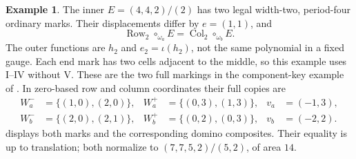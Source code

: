 \documentclass[11pt,a4paper]{amsart}
\numberwithin{equation}{section}
\theoremstyle{plain}
\theoremstyle{definition}
\newtheorem{example}[theorem]{Example}
\newcommand{\Row}{\operatorname{Row}}
\newcommand{\Col}{\operatorname{Col}}
\newcommand{\ii}{\iota}
\begin{document}
\begin{example}\label{ex:gauge}
The inner \(E=(4,4,2)/(2)\) has two legal width-two, period-four
ordinary marks.  Their displacements differ by \(e=(1,1)\), and
\[
 \Row_2\circ_{\omega_a}E=\Col_2\circ_{\omega_b}E.
\]
The outer functions are \(h_2\) and \(e_2=\ii(h_2)\), not the same
polynomial in a fixed gauge.  Each end mark has two cells adjacent to
the middle, so this example uses I--IV without V.  These are the two
full markings in the component-key example of \cite{Shields2026Gluing}.
In zero-based row and column coordinates their full copies are
\[
 \begin{aligned}
 W_a^-&=\{(1,0),(2,0)\},&
 W_a^+&=\{(0,3),(1,3)\},&v_a&=(-1,3),\\
 W_b^-&=\{(2,0),(2,1)\},&
 W_b^+&=\{(0,2),(0,3)\},&v_b&=(-2,2).
 \end{aligned}
\]
 displays both marks and the corresponding
domino composites.  Their equality is up to translation; both
normalize to \((7,7,5,2)/(5,2)\), of area \(14\).
\end{example}
\end{document}
